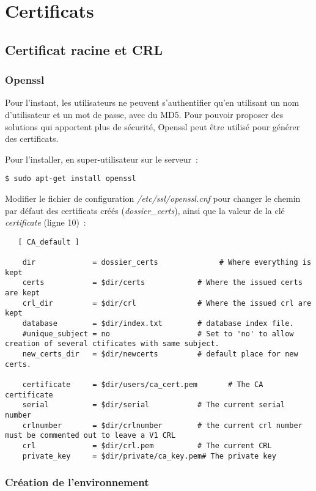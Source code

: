 \section{Certificats}
\subsection{Certificat racine et CRL}
\subsubsection{Openssl}

Pour l'instant, les utilisateurs ne peuvent s'authentifier qu'en utilisant un nom d'utilisateur et un mot de passe, avec du MD5. Pour pouvoir proposer des solutions qui apportent plus de sécurité, Openssl peut être utilisé pour générer des certificats.

Pour l'installer, en super-utilisateur sur le serveur~:

\begin{lstlisting}
$ sudo apt-get install openssl
\end{lstlisting}

Modifier le fichier de configuration \emph{/etc/ssl/openssl.cnf} pour changer le chemin par défaut des certificats créés (\emph{dossier\_certs}), ainsi que la valeur de la clé \emph{certificate} (ligne 10)~:

\begin{lstlisting}
   [ CA_default ]

    dir             = dossier_certs              # Where everything is kept
    certs           = $dir/certs            # Where the issued certs are kept
    crl_dir         = $dir/crl              # Where the issued crl are kept
    database        = $dir/index.txt        # database index file.
    #unique_subject = no                    # Set to 'no' to allow creation of several ctificates with same subject.
    new_certs_dir   = $dir/newcerts         # default place for new certs.

    certificate     = $dir/users/ca_cert.pem       # The CA certificate
    serial          = $dir/serial           # The current serial number
    crlnumber       = $dir/crlnumber        # the current crl number must be commented out to leave a V1 CRL
    crl             = $dir/crl.pem          # The current CRL
    private_key     = $dir/private/ca_key.pem# The private key
\end{lstlisting}

\subsubsection{Création de l'environnement}

